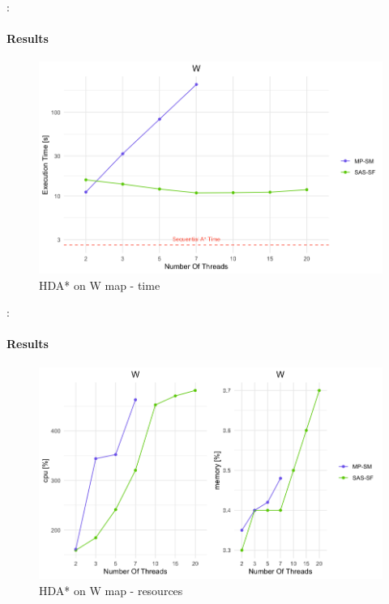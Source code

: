 \documentclass[12pt]{beamer}
\begin{document}
	\begin{frame}{\secname : \subsecname}
		\framesubtitle{Results}
		\begin{figure}[ht!]
			\centering
			\includegraphics[width=0.8\linewidth]{hda/wtime.png}
			\caption{HDA* on W map - time}
		\end{figure}
	\end{frame}
	\begin{frame}{\secname : \subsecname}
		\framesubtitle{Results}
		\begin{figure}[ht!]
			\centering
			\includegraphics[width=0.8\linewidth]{hda/wcpumem.png}
			\caption{HDA* on W map - resources}
		\end{figure}
	\end{frame}
\end{document}
